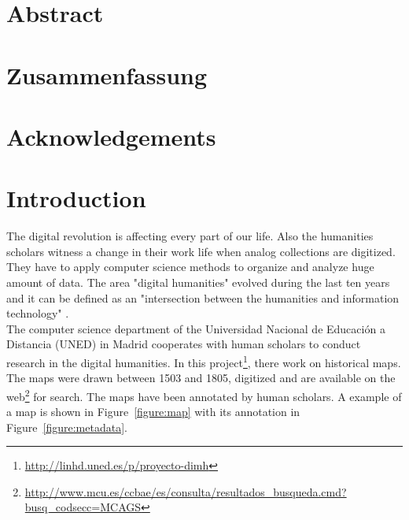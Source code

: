 \documentclass[11pt]{report}
\begin{document}


\renewcommand{\thepage}{\roman{page}}%

\newpage
\thispagestyle{empty}
\mbox{}

\chapter*{Abstract}
\blindtext

\newpage
\thispagestyle{empty}
\mbox{}

\chapter*{Zusammenfassung}
\blindtext

\newpage
\thispagestyle{empty}
\mbox{}

\chapter*{Acknowledgements}
\blindtext

\newpage
\thispagestyle{empty}
\mbox{}

\tableofcontents
\newpage

\printglossary[type=\acronymtype]

\newpage
\thispagestyle{empty}
\mbox{}

\chapter{Introduction}
\label{Introduction}

\renewcommand{\thepage}{\arabic{page}}
\setcounter{page}{1}

The digital revolution is affecting every part of our life. Also the humanities scholars witness a change in their work life when analog collections are digitized. They have to apply computer science methods to organize and analyze huge amount of data. The area "digital humanities" evolved during the last ten years and it can be defined as an "intersection between the humanities and information technology" \cite{Svensson2010}.\\

 The computer science department of the Universidad Nacional de Educación a Distancia (UNED) in Madrid cooperates with human scholars to conduct research in the digital humanities. In this project\footnote{\url{http://linhd.uned.es/p/proyecto-dimh}}, there work on historical maps. The maps were drawn between 1503 and 1805, digitized and are available on the web\footnote{\url{http://www.mcu.es/ccbae/es/consulta/resultados_busqueda.cmd?busq_codsecc=MCAGS}} for search. The maps have been annotated by human scholars. A example of a map is shown in Figure~\ref{figure:map} with its annotation in Figure~\ref{figure:metadata}. \\
 
\end{document}
